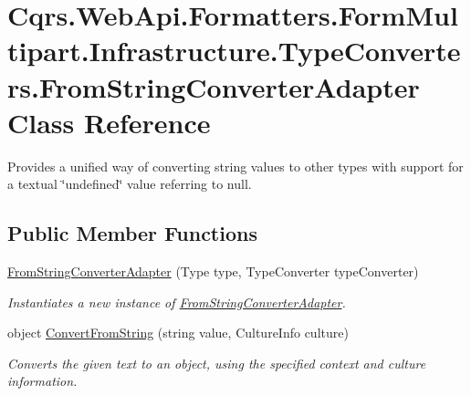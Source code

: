 \hypertarget{classCqrs_1_1WebApi_1_1Formatters_1_1FormMultipart_1_1Infrastructure_1_1TypeConverters_1_1FromStringConverterAdapter}{}\section{Cqrs.\+Web\+Api.\+Formatters.\+Form\+Multipart.\+Infrastructure.\+Type\+Converters.\+From\+String\+Converter\+Adapter Class Reference}
\label{classCqrs_1_1WebApi_1_1Formatters_1_1FormMultipart_1_1Infrastructure_1_1TypeConverters_1_1FromStringConverterAdapter}


Provides a unified way of converting string values to other types with support for a textual \char`\"{}undefined\char`\"{} value referring to null.  


\subsection*{Public Member Functions}
\begin{DoxyCompactItemize}
\item 
\hyperlink{classCqrs_1_1WebApi_1_1Formatters_1_1FormMultipart_1_1Infrastructure_1_1TypeConverters_1_1FromStringConverterAdapter_a8861572dad983012fbe36488b2b6913a_a8861572dad983012fbe36488b2b6913a}{From\+String\+Converter\+Adapter} (Type type, Type\+Converter type\+Converter)
\begin{DoxyCompactList}\small\item\em Instantiates a new instance of \hyperlink{classCqrs_1_1WebApi_1_1Formatters_1_1FormMultipart_1_1Infrastructure_1_1TypeConverters_1_1FromStringConverterAdapter}{From\+String\+Converter\+Adapter}. \end{DoxyCompactList}\item 
object \hyperlink{classCqrs_1_1WebApi_1_1Formatters_1_1FormMultipart_1_1Infrastructure_1_1TypeConverters_1_1FromStringConverterAdapter_aac70ae2f2845154556163073178d0438_aac70ae2f2845154556163073178d0438}{Convert\+From\+String} (string value, Culture\+Info culture)
\begin{DoxyCompactList}\small\item\em Converts the given text to an object, using the specified context and culture information. \end{DoxyCompactList}\end{DoxyCompactItemize}


